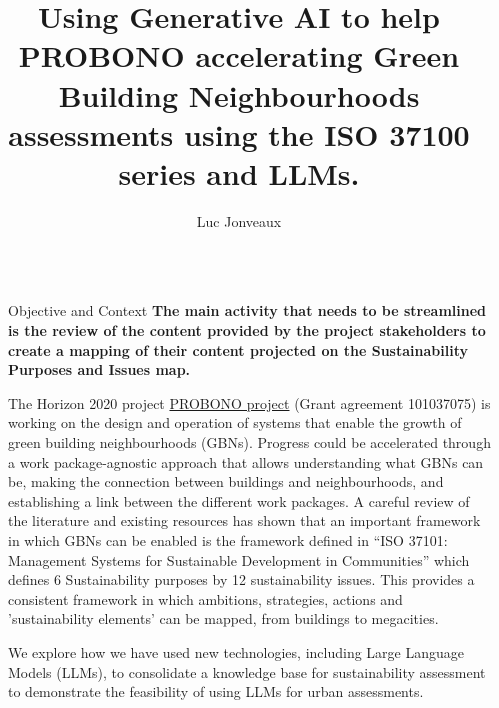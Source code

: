\documentclass[final]{beamer}
\title{Using Generative AI to help PROBONO accelerating Green Building Neighbourhoods  assessments using the ISO 37100 series and LLMs. }} %
\author{Luc Jonveaux} %
\institute{The Integrator-centric approach for realising innovative energy efficient buildings in connected sustainable green neighbourhoods project } %
\newlength{\sepmargin}
\newlength{\onecolwid}
\begin{document}
\textblockorigin{10mm}{10mm} %
  \setlength{\belowcaptionskip}{2ex} %
  \setlength\belowdisplayshortskip{1ex} %
  
  


      \begin{columns}[t] %
	  
      \begin{column}{\sepmargin}\end{column}
      
	    \begin{column}{\onecolwid} %

\vspace{4.5cm}
		  \begin{block}{Objective and Context}
\textbf{The main activity that needs to be streamlined is the review of the content provided by the project stakeholders to create a mapping of their content projected on the Sustainability Purposes and Issues map.}

The Horizon 2020 project \href{https://doi.org/10.3030/101037075}{PROBONO project} (Grant agreement 101037075) is working on the design and operation of systems that enable the growth of green building neighbourhoods (GBNs). Progress could be accelerated through a work package-agnostic approach that allows understanding what GBNs can be, making the connection between buildings and neighbourhoods, and establishing a link between the different work packages. A careful review of the literature and existing resources has shown that an important framework in which GBNs can be enabled is the framework defined in “ISO 37101: Management Systems for Sustainable Development in Communities” which defines 6 Sustainability purposes by 12 sustainability issues. This provides a consistent framework in which ambitions, strategies, actions and 'sustainability elements' can be mapped, from buildings to megacities.

We explore how we have used new technologies, including Large Language Models (LLMs), to consolidate a knowledge base for sustainability assessment to demonstrate the feasibility of using LLMs for urban assessments.
\end{block}


\end{column}
\end{columns}
\end{document}
